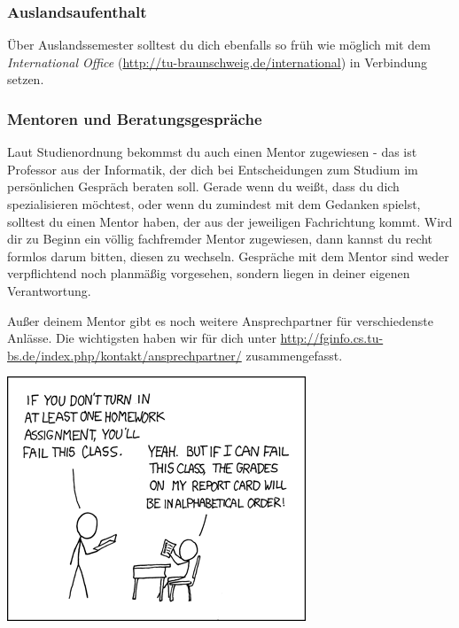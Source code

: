 \subsubsection{Auslandsaufenthalt}
	Über Auslandssemester solltest du dich ebenfalls so früh wie möglich mit dem \emph{International Office} (\url{http://tu-braunschweig.de/international}) in Verbindung setzen.

\subsubsection{Mentoren und Beratungsgespräche}
	Laut Studienordnung bekommst du auch einen Mentor zugewiesen - das ist Professor aus der Informatik, der dich bei Entscheidungen zum Studium im persönlichen Gespräch beraten soll. Gerade wenn du weißt, dass du dich spezialisieren möchtest, oder wenn du zumindest mit dem Gedanken spielst, solltest du einen Mentor haben, der aus der jeweiligen Fachrichtung kommt. Wird dir zu Beginn ein völlig fachfremder Mentor zugewiesen, dann kannst du recht formlos darum bitten, diesen zu wechseln. Gespräche mit dem Mentor sind weder verpflichtend noch planmäßig vorgesehen, sondern liegen in deiner eigenen Verantwortung.

	Außer deinem Mentor gibt es noch weitere Ansprechpartner für verschiedenste Anlässe. Die wichtigsten haben wir für dich unter \url{http://fginfo.cs.tu-bs.de/index.php/kontakt/ansprechpartner/} zusammengefasst.
\begin{center}
\includegraphics[totalheight=6cm]{bilder/XKCD/priorities}
\end{center}
